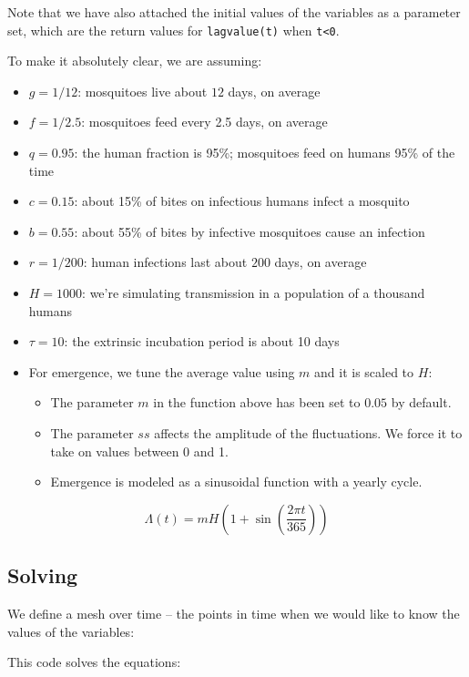 \documentclass[
]{book}
\begin{document}
Note that we have also attached the initial values of the variables as a parameter set, which are the return values for \texttt{lagvalue(t)} when \texttt{t\textless{}0}.

To make it absolutely clear, we are assuming:

\begin{itemize}
\item
  \(g=1/12\): mosquitoes live about \(12\) days, on average
\item
  \(f=1/2.5\): mosquitoes feed every 2.5 days, on average
\item
  \(q=0.95\): the human fraction is 95\%; mosquitoes feed on humans 95\% of the time
\item
  \(c=0.15\): about 15\% of bites on infectious humans infect a mosquito
\item
  \(b=0.55\): about 55\% of bites by infective mosquitoes cause an infection
\item
  \(r=1/200\): human infections last about \(200\) days, on average
\item
  \(H=1000\): we're simulating transmission in a population of a thousand humans
\item
  \(\tau=10\): the extrinsic incubation period is about 10 days
\item
  For emergence, we tune the average value using \(m\) and it is scaled to \(H\):

  \begin{itemize}
  \item
    The parameter \(m\) in the function above has been set to \(0.05\) by default.
  \item
    The parameter \(ss\) affects the amplitude of the fluctuations. We force it to take on values between 0 and 1.
  \item
    Emergence is modeled as a sinusoidal function with a yearly cycle.
  \end{itemize}
\end{itemize}

\[\Lambda(t) = m H \left(1 + \sin \left(\frac{2\pi t}{365}\right)\right)\]

\subsection{Solving}\label{solving-1}

We define a mesh over time -- the points in time when we would like to know the values of the variables:

This code solves the equations:
\end{document}

